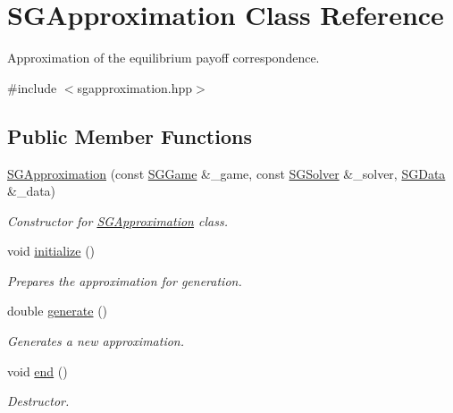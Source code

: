\hypertarget{classSGApproximation}{\section{S\-G\-Approximation Class Reference}
\label{classSGApproximation}
}


Approximation of the equilibrium payoff correspondence.  




{\ttfamily \#include $<$sgapproximation.\-hpp$>$}

\subsection*{Public Member Functions}
\begin{DoxyCompactItemize}
\item 
\hypertarget{classSGApproximation_ade127071d4721d4686f065d5cb64fc35}{\hyperlink{classSGApproximation_ade127071d4721d4686f065d5cb64fc35}{S\-G\-Approximation} (const \hyperlink{classSGGame}{S\-G\-Game} \&\-\_\-game, const \hyperlink{classSGSolver}{S\-G\-Solver} \&\-\_\-solver, \hyperlink{classSGData}{S\-G\-Data} \&\-\_\-data)}\label{classSGApproximation_ade127071d4721d4686f065d5cb64fc35}

\begin{DoxyCompactList}\small\item\em Constructor for \hyperlink{classSGApproximation}{S\-G\-Approximation} class. \end{DoxyCompactList}\item 
void \hyperlink{classSGApproximation_a6dbc44c8105eefdb1be4496e8a4a71c7}{initialize} ()
\begin{DoxyCompactList}\small\item\em Prepares the approximation for generation. \end{DoxyCompactList}\item 
double \hyperlink{classSGApproximation_aab259146004327089bd52375c51bd4ec}{generate} ()
\begin{DoxyCompactList}\small\item\em Generates a new approximation. \end{DoxyCompactList}\item 
void \hyperlink{classSGApproximation_a1956d20837fee2576590f63cafaa91dc}{end} ()
\begin{DoxyCompactList}\small\item\em Destructor. \end{DoxyCompactList}\end{DoxyCompactItemize}
